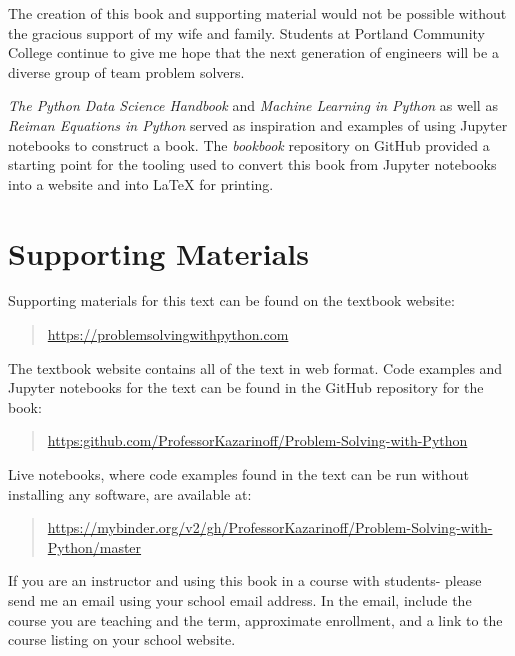 \documentclass{book}
\begin{document}
    
        The creation of this book and supporting material would not be possible
without the gracious support of my wife and family. Students at Portland
Community College continue to give me hope that the next generation of
engineers will be a diverse group of team problem solvers.

\emph{The Python Data Science Handbook} and \emph{Machine Learning in
Python} as well as \emph{Reiman Equations in Python} served as
inspiration and examples of using Jupyter notebooks to construct a book.
The \emph{bookbook} repository on GitHub provided a starting point for
the tooling used to convert this book from Jupyter notebooks into a
website and into LaTeX for printing.
    




    
        \hypertarget{supporting-materials}{%
\section{Supporting Materials}\label{supporting-materials}}
    




    
        Supporting materials for this text can be found on the textbook website:

\begin{quote}
\url{https://problemsolvingwithpython.com}
\end{quote}

The textbook website contains all of the text in web format. Code
examples and Jupyter notebooks for the text can be found in the GitHub
repository for the book:

\begin{quote}
\url{https:github.com/ProfessorKazarinoff/Problem-Solving-with-Python}
\end{quote}

Live notebooks, where code examples found in the text can be run without
installing any software, are available at:

\begin{quote}
\url{https://mybinder.org/v2/gh/ProfessorKazarinoff/Problem-Solving-with-Python/master}
\end{quote}

If you are an instructor and using this book in a course with students-
please send me an email using your school email address. In the email,
include the course you are teaching and the term, approximate
enrollment, and a link to the course listing on your school website.
\end{document}
